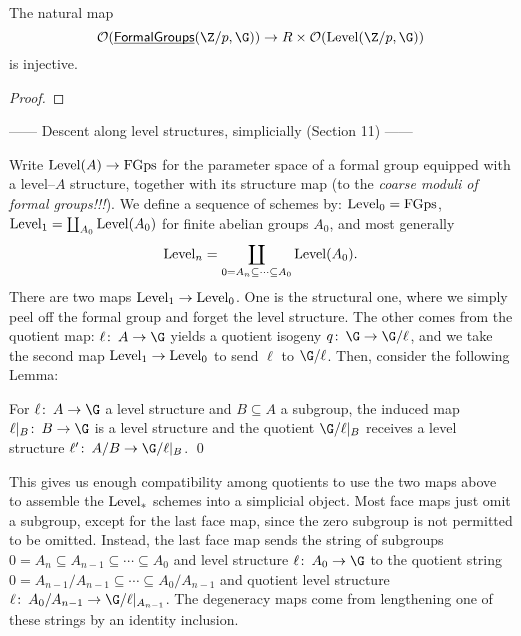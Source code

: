 \begin{lemma} 
The natural map \[\sheaf O(\InternalHom{FormalGroups}(\Z/p, \G)) \to R \times \sheaf O(\Level(\Z/p, \G))\] is injective.
\end{lemma}
\begin{proof}
\end{proof}



------ Descent along level structures, simplicially (Section 11) ------


Write $\operatorname{Level}(A) \to \mathrm{FGps}$ for the parameter space of a formal group equipped with a level--$A$ structure, together with its structure map (to the \emph{coarse moduli of formal groups!!!}).  We define a sequence of schemes by: $\operatorname{Level}_0 = \mathrm{FGps}$, $\operatorname{Level}_1 = \coprod_{A_0} \operatorname{Level}(A_0)$ for finite abelian groups $A_0$, and most generally \[\operatorname{Level}_n = \coprod_{0 = A_n \subseteq \cdots \subseteq A_0} \operatorname{Level}(A_0).\]  There are two maps $\operatorname{Level}_1 \to \operatorname{Level}_0$.  One is the structural one, where we simply peel off the formal group and forget the level structure.  The other comes from the quotient map: $\ell\co A \to \G$ yields a quotient isogeny $q\co \G \to \G/\ell$, and we take the second map $\operatorname{Level}_1 \to \operatorname{Level}_0$ to send $\ell$ to $\G / \ell$.  Then, consider the following Lemma:

\begin{lemma}
For $\ell\co A \to \G$ a level structure and $B \subseteq A$ a subgroup, the induced map $\ell|_B\co B \to \G$ is a level structure and the quotient $\G / \ell|_B$ receives a level structure $\ell'\co A/B \to \G/\ell|_B$. \qed
\end{lemma}

This gives us enough compatibility among quotients to use the two maps above to assemble the $\operatorname{Level}_*$ schemes into a simplicial object.  Most face maps just omit a subgroup, except for the last face map, since the zero subgroup is not permitted to be omitted.  Instead, the last face map sends the string of subgroups $0 = A_n \subseteq A_{n-1} \subseteq \cdots \subseteq A_0$ and level structure $\ell\co A_0 \to \G$ to the quotient string $0 = A_{n-1} / A_{n-1} \subseteq \cdots \subseteq A_0 / A_{n-1}$ and quotient level structure $\ell\co A_0 / A_{n-1} \to \G/\ell|_{A_{n-1}}$.  The degeneracy maps come from lengthening one of these strings by an identity inclusion.

